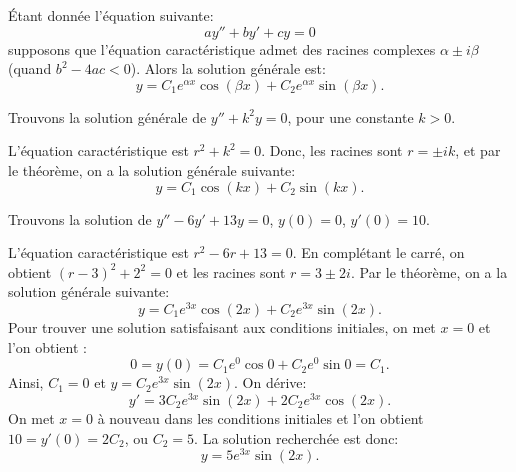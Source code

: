 \begin{theorem}
Étant donnée l'équation suivante:
\begin{equation*}
ay'' + by' + cy = 0 
\end{equation*}
supposons que l'équation caractéristique admet des racines complexes $\alpha \pm i \beta$
(quand $b^2 - 4ac < 0$).
Alors la solution générale est: 
\begin{equation*}
y = C_1 e^{\alpha x} \cos (\beta x) + C_2 e^{\alpha x} \sin (\beta x) .
\end{equation*}
\end{theorem}

\begin{example} \label{example:sincossecondorder}
Trouvons la solution générale de $y'' + k^2 y = 0$, pour une constante 
$k > 0$.

L'équation caractéristique est  $r^2 + k^2 = 0$.  Donc, les racines sont 
$r = \pm ik$, et par le théorème, on a la solution générale  suivante:
\begin{equation*}
y = C_1 \cos (kx) + C_2 \sin (kx) .
\end{equation*}
\end{example}

\begin{example}
Trouvons la solution de  $y'' - 6 y' + 13 y = 0$, $y(0) = 0$, $y'(0) =
10$.

L'équation caractéristique est  $r^2 - 6 r + 13 = 0$. En complétant le carré, on obtient   ${(r-3)}^2 + 2^2 = 0$ et les racines sont
$r = 3 \pm 2i$.
Par le théorème, on a la solution générale suivante:
\begin{equation*}
y = C_1 e^{3x} \cos (2x) + C_2 e^{3x} \sin (2x) .
\end{equation*}
Pour trouver une solution satisfaisant aux conditions initiales, on met $x=0$ et l'on obtient :
\begin{equation*}
0 = y(0) = C_1 e^{0} \cos 0 + C_2 e^{0} \sin 0  = C_1 .
\end{equation*}
Ainsi, $C_1 = 0$ et $y = C_2 e^{3x} \sin (2x)$.  On dérive: 
\begin{equation*}
y' = 3C_2 e^{3x} \sin (2x) + 2C_2 e^{3x} \cos (2x) .
\end{equation*}
On met $x=0$ à nouveau dans les conditions initiales et l'on obtient  $10 = y'(0) = 2C_2$, ou
$C_2 = 5$.  La solution recherchée est donc:
\begin{equation*}
y = 5 e^{3x} \sin (2x) .
\end{equation*}
\end{example}

